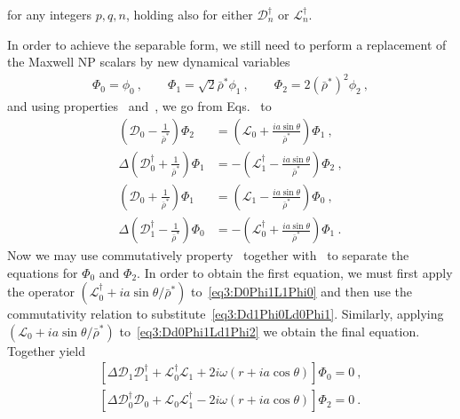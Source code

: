 for any integers $p,q,n$, holding also for either $\mathscr{D}^\dagger_n$ or $\mathscr{L}^\dagger_n$.

In order to achieve the separable form, we still need to perform a replacement of the Maxwell NP scalars by new dynamical variables
\begin{align}
    \label{eq3:phiBarRhoToPhi}
    \Phi_0 = \phi_0 ~,\qquad \Phi_1 = \sqrt{2} \bar{\rho}^* \phi_1 ~,\qquad \Phi_2 = 2 (\bar{\rho}^*)^2 \phi_2  ~,
\end{align}
and using properties~ and~, we go from Eqs.~ to
\begin{subequations}
    \begin{align}
        \label{eq3:D0Phi2L0Phi1}
        \left( \mathscr{D}_0 - \frac{1}{\bar{\rho}^*} \right) \Phi_2 &=
        \left( \mathscr{L}_0 + \frac{i a \sin\theta}{\bar{\rho}^*} \right) \Phi_1 ~, \\
        \label{eq3:Dd0Phi1Ld1Phi2}
        \Delta \left( \mathscr{D}^\dagger_0 + \frac{1}{\bar{\rho}^*} \right) \Phi_1 &= 
        -\left( \mathscr{L}^\dagger_1 - \frac{i a \sin\theta}{\bar{\rho}^*} \right) \Phi_2 ~, \\
        \label{eq3:D0Phi1L1Phi0}
        \left( \mathscr{D}_0 + \frac{1}{\bar{\rho}^*} \right) \Phi_1 &= 
        \left( \mathscr{L}_1 - \frac{i a \sin\theta}{\bar{\rho}^*} \right) \Phi_0 ~, \\
        \label{eq3:Dd1Phi0Ld0Phi1}
        \Delta \left( \mathscr{D}^\dagger_1 - \frac{1}{\bar{\rho}^*} \right) \Phi_0 &= 
        -\left( \mathscr{L}^\dagger_0 + \frac{i a \sin\theta}{\bar{\rho}^*} \right) \Phi_1 ~.
    \end{align}
    \label{eq3:AllDPhiLPhi}
\end{subequations}
Now we may use commutatively property~ together with~ to separate the equations for $\Phi_0$ and $\Phi_2$.
In order to obtain the first equation, we must first apply the operator $(\mathscr{L}^\dagger_0 + i a \sin\theta/\bar{\rho}^*)$ to~\eqref{eq3:D0Phi1L1Phi0} and then use the commutativity relation to substitute~\eqref{eq3:Dd1Phi0Ld0Phi1}.
Similarly, applying $(\mathscr{L}_0 + i a \sin\theta/\bar{\rho}^*)$ to~\eqref{eq3:Dd0Phi1Ld1Phi2} we obtain the final equation.
Together yield
\begin{align}
    \label{eq3:DDLLPhi0}
    \left[ \Delta \mathscr{D}_1 \mathscr{D}^\dagger_1 + \mathscr{L}^\dagger_0 \mathscr{L}_1 + 2 i \omega (r+i a \cos\theta) \right] \Phi_0 = 0 ~, \\
    \label{eq3:DDLLPhi2}
    \left[ \Delta \mathscr{D}^\dagger_0 \mathscr{D}_0 + \mathscr{L}_0 \mathscr{L}^\dagger_1 - 2 i \omega (r+i a \cos\theta) \right] \Phi_2 = 0 ~.
\end{align}

